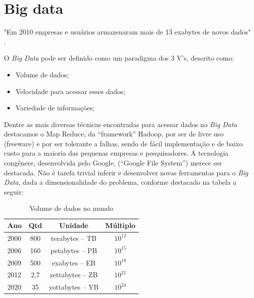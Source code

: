 \section*{ Big data}

"Em 2010 empresas e usuários armazenaram mais de 13 exabytes de novos dados" \cite{bigdataQualquerUm}.

O \textit{Big Data} pode ser definido como um paradigma dos 3 V’s, descrito como: 

\begin{table}[htbp]
 \begin{itemize}
   \item Volume de dados;
   \item Velocidade para acessar esses dados;
   \item Variedade de informações;
 \end{itemize}
\end{table}

  
Dentre as mais diversas técnicas encontradas para acessar dados no \textit{Big Data} destacamos o Map Reduce, da ``framework'' Hadoop, por ser de livre uso (freeware) e 
por ser tolerante a falhas, sendo de fácil implementação e de baixo custo para a maioria das pequenas empresas e pesquisadores.
A tecnologia congênere, desenvolvida pelo Google, (``Google File System'') merece ser destacada. 
Não é tarefa trivial inferir e desenvolver novas ferramentas para o \textit{Big Data}, dada a dimensionalidade do problema, conforme destacado na tabela a seguir:


\begin{table}[!ht]
\centering
\caption{Volume de dados no mundo}
\vspace{1mm}
\begin{tabular}{l|c|c|c}
\hline
\textbf{Ano} & \textbf{Qtd} & \textbf{Unidade} & \textbf{Múltiplo}\\
\hline
2000 & 800 & terabytes – TB & $10^{12}$\\
2006 & 160 & petabytes – PB & $10^{15}$\\
2009 & 500 & exabytes – EB & $10^{18}$ \\
2012 & 2,7 & zettabytes – ZB & $10^{21}$\\
2020 & 35 & yottabytes – YB & $10^{24}$\\
\end{tabular}
\end{table}

\pagebreak

